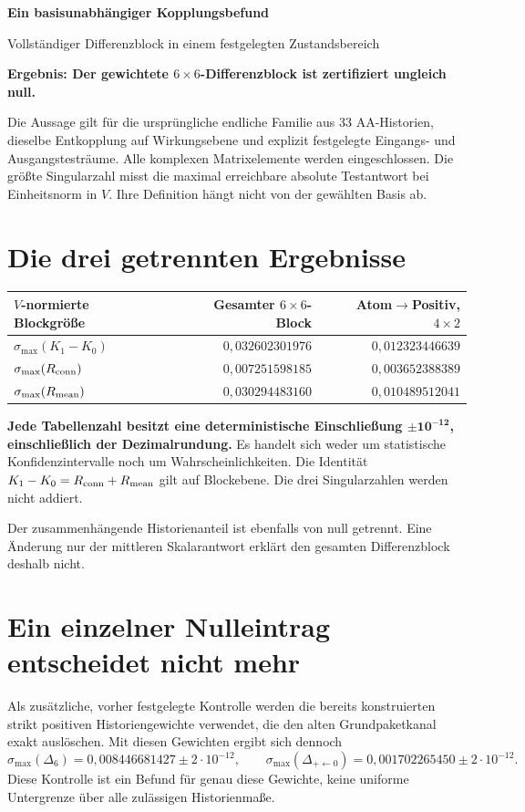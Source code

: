 \documentclass[10pt,a4paper]{article}
\begin{document}
{\color{ink}\LARGE\bfseries Ein basisunabhängiger Kopplungsbefund}\par
{\large Vollständiger Differenzblock in einem festgelegten Zustandsbereich}\par
\textbf{Ergebnis: Der gewichtete $6\times6$-Differenzblock ist zertifiziert ungleich null.}

Die Aussage gilt für die ursprüngliche endliche Familie aus 33 AA-Historien,
dieselbe Entkopplung auf Wirkungsebene und explizit festgelegte Eingangs- und
Ausgangstesträume. Alle komplexen Matrixelemente werden eingeschlossen.
Die größte Singularzahl misst die maximal erreichbare absolute Testantwort
bei Einheitsnorm in $V$. Ihre Definition hängt nicht von der gewählten Basis ab.

\section*{Die drei getrennten Ergebnisse}
\begin{center}\begin{tabular}{lrr}\toprule
$V$-normierte Blockgröße & Gesamter $6\times6$-Block & Atom$\to$Positiv, $4\times2$\\\midrule
$\sigma_{\max}(K_1-K_0)$ & $0{,}032602301976$ & $0{,}012323446639$\\
$\sigma_{\max}(R_{\rm conn})$ & $0{,}007251598185$ & $0{,}003652388389$\\
$\sigma_{\max}(R_{\rm mean})$ & $0{,}030294483160$ & $0{,}010489512041$\\\bottomrule
\end{tabular}\end{center}
\textbf{Jede Tabellenzahl besitzt eine deterministische Einschließung
$\boldsymbol{\pm10^{-12}}$, einschließlich der Dezimalrundung.}
Es handelt sich weder um statistische Konfidenzintervalle noch um
Wahrscheinlichkeiten. Die Identität $K_1-K_0=R_{\rm conn}+R_{\rm mean}$ gilt auf
Blockebene. Die drei Singularzahlen werden nicht addiert.

Der zusammenhängende Historienanteil ist ebenfalls von null getrennt.
Eine Änderung nur der mittleren Skalarantwort erklärt den gesamten
Differenzblock deshalb nicht.

\section*{Ein einzelner Nulleintrag entscheidet nicht mehr}
Als zusätzliche, vorher festgelegte Kontrolle werden die bereits konstruierten
strikt positiven Historiengewichte verwendet, die den alten Grundpaketkanal
exakt auslöschen. Mit diesen Gewichten ergibt sich dennoch
\[
 \sigma_{\max}(\Delta_6)=0{,}008446681427\pm2\cdot10^{-12},\qquad
 \sigma_{\max}(\Delta_{+\leftarrow0})=0{,}001702265450\pm2\cdot10^{-12}.
\]
Diese Kontrolle ist ein Befund für genau diese Gewichte, keine uniforme
Untergrenze über alle zulässigen Historienmaße.
\end{document}
